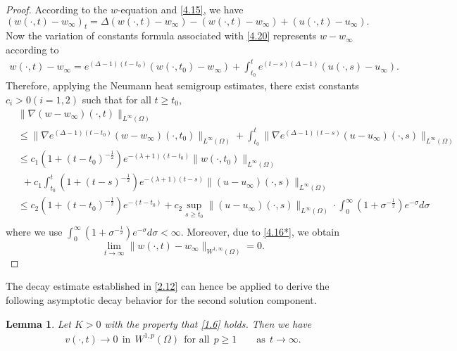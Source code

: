 \documentclass[12pt]{article}
\theoremstyle{plain}
\newtheorem{lemma}{Lemma}[section]
\theoremstyle{definition}
\numberwithin{equation}{section}
\begin{document}
\begin{proof}
According to the $w$-equation and \eqref{4.15}, we have
\begin{equation}\label{4.20}
(w(\cdot,t)-w_{\infty})_t=\Delta(w(\cdot,t)-w_{\infty})
-(w(\cdot,t)-w_{\infty})+(u(\cdot,t)-u_{\infty}).
\end{equation}
Now the variation of constants formula associated with \eqref{4.20} represents $w-w_{\infty}$ according to
\begin{equation}\label{4.21}
\begin{split}
w(\cdot,t)-w_{\infty}= e^{(\Delta-1)(t-t_0)}(w(\cdot,t_0)-w_{\infty})+\int_{t_0}^te^{(t-s)(\Delta-1)}(u(\cdot,s)-u_{\infty}).
\end{split}
\end{equation}
Therefore, applying the Neumann heat semigroup estimates, there exist constants $c_i>0(i=1,2)$ such that for all $t\geq t_0$,
\begin{equation}
\begin{split}
&\|\nabla(w-w_{\infty})(\cdot,t)\|_{L^{\infty}(\Omega)}\\
&\leq \|\nabla e^{(\Delta-1)(t-t_0)}(w-w_{\infty})(\cdot,t_0)\|_{L^{\infty}(\Omega)}
+\int_{t_0}^t\| \nabla e^{(\Delta-1)(t-s)}(u-u_{\infty})(\cdot,s)\|_{L^{\infty}(\Omega)}\\
&\leq c_1 (1+(t-t_0)^{-\frac1 2}) e^{-(\lambda+1)(t-t_0)}\|w(\cdot,t_0)\|_{L^{\infty}(\Omega)}\\
&~~+c_1\int_{t_0}^t (1+(t-s)^{-\frac1 2})e^{-(\lambda+1)(t-s)}\|(u-u_{\infty})(\cdot,s)\|_{L^{\infty}(\Omega)}\\
&\leq c_2  (1+(t-t_0)^{-\frac1 2}) e^{-(t-t_0)}+c_2\sup\limits_{s\geq t_0}\|(u-u_{\infty})(\cdot,s)\|_{L^{\infty}(\Omega)}\cdot\int_{0}^{\infty} (1+\sigma^{-\frac1 2}) e^{-\sigma} d\sigma\\
\end{split}
\end{equation}
where we use $\int_0^{\infty}(1+\sigma^{-\frac{1}{2}})e^{-\sigma}d\sigma<\infty$. Moreover, due to \eqref{4.16*}, we obtain $$\lim\limits_{t\to\infty}\|w(\cdot,t)-w_{\infty}\|_{W^{1,\infty} (\Omega)}=0.
$$
\end{proof}
The decay estimate established in \eqref{2.12} can  hence be applied to derive the following asymptotic decay behavior for the second solution component.
\begin{lemma}\label{lemma4.6}
Let $K>0$ with the property that \eqref{1.6} holds.  Then  we have
\begin{align}\label{4.25}
    v(\cdot,t)\rightarrow 0 ~~\mbox{in}~~W^{1,p}(\Omega)~~\mbox{for all}~~p\geq 1\qquad \mbox{as}~~ t\to \infty.
\end{align}
\end{lemma}
\end{document}
